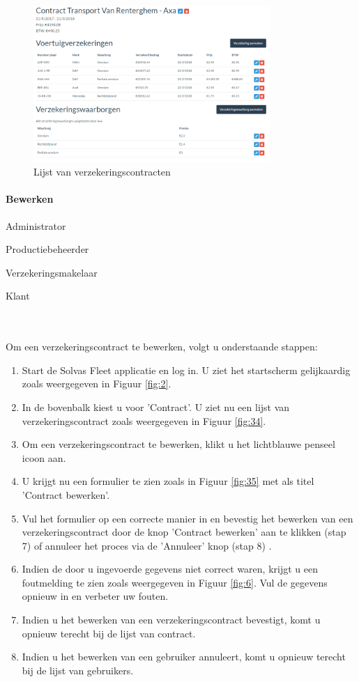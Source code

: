 \documentclass[11pt,openany]{article}
\newcommand{\cmark}{\ding{51}}%
\newcommand{\xmark}{\ding{55}}%
\newcommand{\done}{\rlap{$\square$}{\raisebox{2pt}{\large\hspace{1pt}\cmark}}%
	\hspace{-2.5pt}}
\newcommand{\wontfix}{\rlap{$\square$}{\large\hspace{1pt}\xmark}}
\begin{document}
\begin{figure}
	\centering
	\includegraphics[width=0.8\textwidth]{img/fig36.png}
	\caption{Lijst van verzekeringscontracten} 
	\label{fig:36} 
\end{figure}



\paragraph{Bewerken}
\label{contract_edit}
\begin{todolist}
	\item[\done] Administrator
	\item[\done] Productiebeheerder
	\item[\done] Verzekeringsmakelaar
	\item[\wontfix] Klant 
\end{todolist}
\\
\\
Om een verzekeringscontract te bewerken, volgt u onderstaande stappen:
\begin{enumerate}
	\item Start de Solvas Fleet applicatie en log in. U ziet het startscherm gelijkaardig zoals weergegeven in Figuur \ref{fig:2}.
	\item In de bovenbalk kiest u voor 'Contract'. U ziet nu een lijst van verzekeringscontract zoals weergegeven in Figuur \ref{fig:34}.
	\item Om een verzekeringscontract te bewerken, klikt u het lichtblauwe penseel icoon aan.
	\item U krijgt nu een formulier te zien zoals in Figuur \ref{fig:35} met als titel 'Contract bewerken'.
	\item Vul het formulier op een correcte manier in en bevestig het bewerken van een verzekeringscontract door de knop 'Contract bewerken' aan te klikken (stap 7) of annuleer het proces via de 'Annuleer' knop (stap 8) .
	\item Indien de door u ingevoerde gegevens niet correct waren, krijgt u een foutmelding te zien zoals weergegeven in Figuur \ref{fig:6}. Vul de gegevens opnieuw in en verbeter uw fouten.
	\item Indien u het bewerken van een verzekeringscontract bevestigt, komt u opnieuw terecht bij de lijst van contract.
	\item Indien u het bewerken van een gebruiker annuleert, komt u opnieuw terecht bij de lijst van gebruikers.
\end{enumerate}
\newpage
\end{document}
